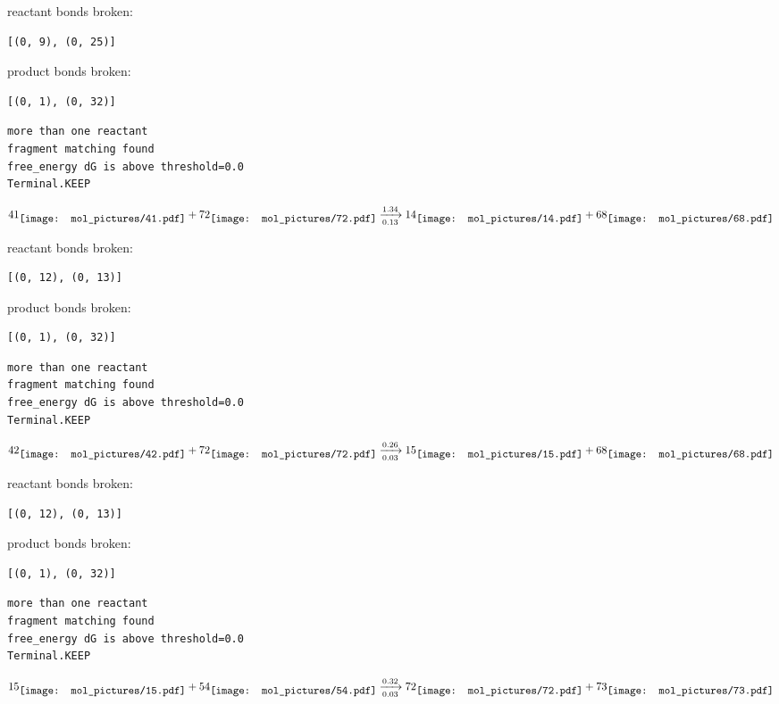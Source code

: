 \documentclass{article}
\begin{document}
reactant bonds broken:\begin{verbatim}
[(0, 9), (0, 25)]
\end{verbatim}
product bonds broken:\begin{verbatim}
[(0, 1), (0, 32)]
\end{verbatim}




\vspace{1cm}
\begin{verbatim}
more than one reactant
fragment matching found
free_energy dG is above threshold=0.0
Terminal.KEEP
\end{verbatim}
$$
41
\raisebox{-.5\height}{\texttt{[image: mol\_pictures/41.pdf]}}
+
72
\raisebox{-.5\height}{\texttt{[image: mol\_pictures/72.pdf]}}
\xrightarrow[0.13]{1.34}
14
\raisebox{-.5\height}{\texttt{[image: mol\_pictures/14.pdf]}}
+
68
\raisebox{-.5\height}{\texttt{[image: mol\_pictures/68.pdf]}}
$$


reactant bonds broken:\begin{verbatim}
[(0, 12), (0, 13)]
\end{verbatim}
product bonds broken:\begin{verbatim}
[(0, 1), (0, 32)]
\end{verbatim}




\vspace{1cm}
\begin{verbatim}
more than one reactant
fragment matching found
free_energy dG is above threshold=0.0
Terminal.KEEP
\end{verbatim}
$$
42
\raisebox{-.5\height}{\texttt{[image: mol\_pictures/42.pdf]}}
+
72
\raisebox{-.5\height}{\texttt{[image: mol\_pictures/72.pdf]}}
\xrightarrow[0.03]{0.26}
15
\raisebox{-.5\height}{\texttt{[image: mol\_pictures/15.pdf]}}
+
68
\raisebox{-.5\height}{\texttt{[image: mol\_pictures/68.pdf]}}
$$


reactant bonds broken:\begin{verbatim}
[(0, 12), (0, 13)]
\end{verbatim}
product bonds broken:\begin{verbatim}
[(0, 1), (0, 32)]
\end{verbatim}




\vspace{1cm}
\begin{verbatim}
more than one reactant
fragment matching found
free_energy dG is above threshold=0.0
Terminal.KEEP
\end{verbatim}
$$
15
\raisebox{-.5\height}{\texttt{[image: mol\_pictures/15.pdf]}}
+
54
\raisebox{-.5\height}{\texttt{[image: mol\_pictures/54.pdf]}}
\xrightarrow[0.03]{0.32}
72
\raisebox{-.5\height}{\texttt{[image: mol\_pictures/72.pdf]}}
+
73
\raisebox{-.5\height}{\texttt{[image: mol\_pictures/73.pdf]}}
$$
\end{document}
